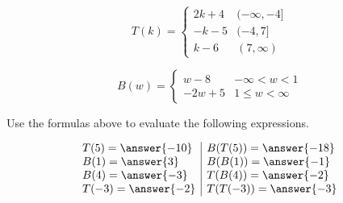 \documentclass{ximera}
\author{Lee Wayand}
\begin{document}
\begin{exercise}





\[
T(k) = 
\begin{cases}
  2k + 4 &  (-\infty, -4]   \\
  -k - 5 &  (-4, 7]  \\
  k - 6 & (7, \infty)
\end{cases}
\]












\[
B(w) = 
\begin{cases}
  w - 8 &   -\infty < w < 1 \\
  -2w + 5 &  1 \leq w < \infty
\end{cases}
\]














Use the formulas above to evaluate the following expressions.



\[
\begin{array}{l|l}
T(5) = \answer{-10}  & B(T(5)) = \answer{-18}   \\
B(1) = \answer{3}  & B(B(1)) = \answer{-1}   \\
B(4) = \answer{-3}  & T(B(4)) = \answer{-2}   \\
T(-3) = \answer{-2}  & T(T(-3)) = \answer{-3}   \\

\end{array}
\]



















\end{exercise}
\end{document}
